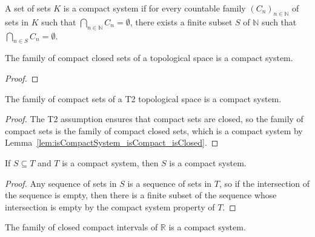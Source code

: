\begin{definition}\label{def:IsCompactSystem}
  \mathlibok
A set of sets $K$ is a compact system if for every countable family $(C_n)_{n \in \mathbb{N}}$ of sets in $K$ such that $\bigcap_{n \in\mathbb{N}} C_n = \emptyset$, there exists a finite subset $S$ of $\mathbb{N}$ such that $\bigcap_{n \in S} C_n = \emptyset$.
\end{definition}


\begin{lemma}\label{lem:isCompactSystem_isCompact_isClosed}
  \leanok
The family of compact closed sets of a topological space is a compact system.
\end{lemma}

\begin{proof}\leanok

\end{proof}


\begin{lemma}\label{lem:isCompactSystem_isCompact}
  \leanok
The family of compact sets of a T2 topological space is a compact system.
\end{lemma}

\begin{proof}\leanok
The T2 assumption ensures that compact sets are closed, so the family of compact sets is the family of compact closed sets, which is a compact system by Lemma~\ref{lem:isCompactSystem_isCompact_isClosed}.
\end{proof}


\begin{lemma}\label{lem:IsCompactSystem.mono}
  \leanok
If $S \subseteq T$ and $T$ is a compact system, then $S$ is a compact system.
\end{lemma}

\begin{proof}\leanok
Any sequence of sets in $S$ is a sequence of sets in $T$, so if the intersection of the sequence is empty, then there is a finite subset of the sequence whose intersection is empty by the compact system property of $T$.
\end{proof}


\begin{lemma}\label{lem:isCompactSystem_Icc}
  \leanok
The family of closed compact intervals of $\mathbb{R}$ is a compact system.
\end{lemma}

